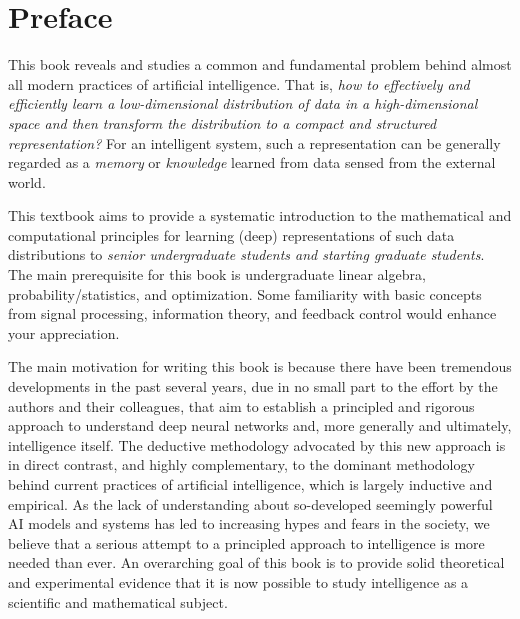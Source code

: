 \documentclass[../../book-main.tex]{subfiles}
\begin{document}
\chapter*{Preface}

This book reveals and studies a common and fundamental problem behind almost all modern practices of artificial intelligence. That is, {\em how to effectively and efficiently learn a low-dimensional distribution of data in a high-dimensional space and then transform the distribution to a compact and structured representation?} For an intelligent system, such a representation can be generally regarded as a {\em memory} or {\em knowledge} learned from data sensed from the external world. 

This textbook aims to provide a systematic introduction to the mathematical and computational principles for learning (deep) representations of such data distributions to {\em senior undergraduate students and starting graduate students}. The main prerequisite for this book is undergraduate linear algebra, probability/statistics, and optimization. Some familiarity with basic concepts from signal processing, information theory, and feedback control would enhance your appreciation. 

The main motivation for writing this book is because there have been tremendous developments in the past several years, due in no small part to the effort by the authors and their colleagues, that aim to establish a principled and rigorous approach to understand deep neural networks and, more generally and ultimately, intelligence itself. The deductive methodology advocated by this new approach is in direct contrast, and highly complementary, to the dominant methodology behind current practices of artificial intelligence, which is largely inductive and empirical. As the lack of understanding about so-developed seemingly powerful AI models and systems has led to increasing hypes and fears in the society, we believe that a serious attempt to a principled  approach to intelligence is more needed than ever. An overarching goal of this book is to provide solid theoretical and experimental evidence that it is now possible to study intelligence as a scientific and mathematical subject. 
\end{document}
